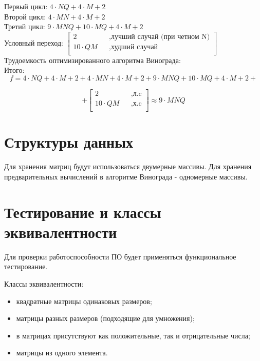 \documentclass[12pt]{report}
\begin{document}
\begin{enumerate}
		Первый цикл: $4 \cdot N  Q + 4 \cdot M + 2$ \\
		
		Второй цикл: $4 \cdot M  N + 4 \cdot M + 2$\\
		
		Третий цикл: $9 \cdot M  N Q + 10 \cdot M Q + 4 \cdot M + 2$\\
		
		Условный переход: $\begin{bmatrix}
			2   &&, \text{лучший случай (при четном N)}\\
			10 \cdot QM &&, \text{худший случай}\\
		\end{bmatrix} $ \\
		
		Трудоемкость оптимизированного алгоритма Винограда:\\
		
		Итого: $$f = 4 \cdot N  Q + 4 \cdot M + 2 + 4 \cdot M  N + 4 \cdot M + 2 + 9 \cdot M  N Q + 10 \cdot M Q + 4 \cdot M + 2 + $$
		
		$$ + \begin{bmatrix}
			2   &&, \text{л.c}\\
			10 \cdot QM &&, \text{х.c}\\
		\end{bmatrix} \approx 9 \cdot MNQ$$
		
		
	\end{enumerate}

	\section{Структуры данных}
	Для хранения матриц будут использоваться двумерные массивы. Для хранения предварительных вычислений в алгоритме Винограда - одномерные массивы.
	
	\section{Тестирование и классы эквивалентности}
	Для проверки работоспособности ПО будет применяться функциональное тестирование.
	
	Классы эквивалентности:
	
	\begin{itemize}
		\item квадратные матрицы одинаковых размеров;
		\item матрицы разных размеров (подходящие для умножения);
		\item в матрицах присутствуют как положительные, так и отрицательные числа;
		\item матрицы из одного элемента.
	\end{itemize}
	
\end{document}
